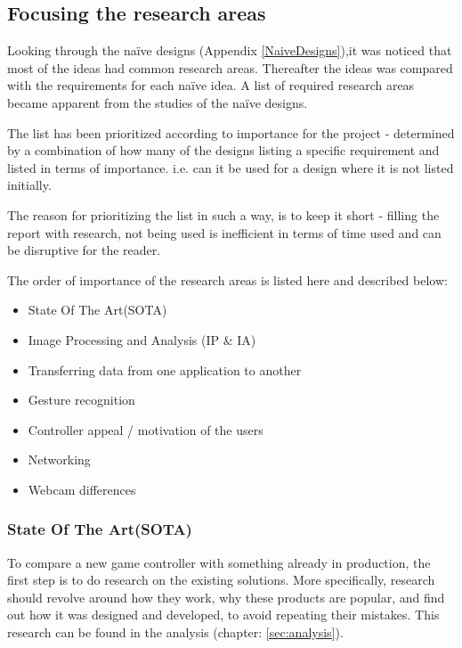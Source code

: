 \subsection{Focusing the research areas}
Looking through the naïve designs (Appendix \ref{NaiveDesigns}),it was noticed that most of the ideas had common research areas. Thereafter the ideas was compared with the requirements for each naïve idea. A list of required research areas became apparent from the studies of the naïve designs.

The list has been prioritized according to importance for the project - determined by a combination of how many of the designs listing a specific requirement and listed in terms of importance. i.e. can it be used for a design where it is not listed initially.

The reason for prioritizing the list in such a way, is to keep it short - filling the report with research, not being used is inefficient in terms of time used and can be disruptive for the reader.
\bigskip

The order of importance of the research areas is listed here and described below:
\begin{itemize}
\item State Of The Art(SOTA)
\item Image Processing and Analysis (IP \& IA)
\item Transferring data from one application to another
\item Gesture recognition
\item Controller appeal / motivation of the users
\item Networking
\item Webcam differences
\end{itemize}

\subsubsection{State Of The Art(SOTA)}
To compare a new game controller with something already in production, the first step is to do research on the existing solutions. More specifically, research should revolve around how they work, why these products are popular, and find out how it was designed and developed, to avoid repeating their mistakes. This research can be found in the analysis (chapter: \ref{sec:analysis}).

